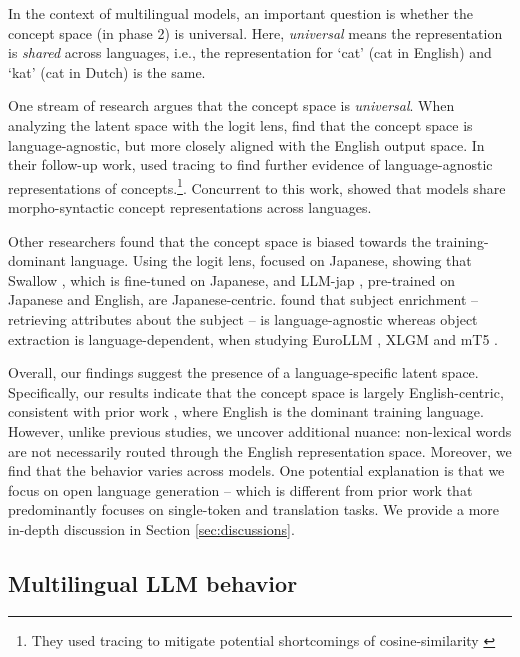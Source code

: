 In the context of multilingual models, an important question is whether the concept space (in phase 2) is universal. 
Here, \textit{universal} means the representation is \textit{shared} across languages, i.e., the representation for `cat' (cat in English) and `kat' (cat in Dutch) is the same.

One stream of research argues that the concept space is \textit{universal}. When analyzing the latent space with the logit lens, \citet{wendler2024llamasworkenglishlatent} 
find that the concept space is language-agnostic, but more closely aligned with the English output space.
In their follow-up work, \citet{dumas2024llamas} used tracing to find further evidence of language-agnostic representations of concepts.\footnote{They used tracing to mitigate potential shortcomings of cosine-similarity \citep{steck2024cosine}}.
Concurrent to this work, \citet{brinkmann2025large} showed that models share morpho-syntactic concept representations across languages.

Other researchers found that the concept space is biased towards the training-dominant language. 
Using the logit lens, \citet{zhong2024beyond} focused on Japanese, showing that Swallow \citep{fujii2024continual}, which is fine-tuned on Japanese, and LLM-jap \cite{aizawa2024llm}, pre-trained on Japanese and English, are Japanese-centric. 
\cite{fierro2025multilinguallanguagemodelsremember} found that subject enrichment -- retrieving attributes about the subject -- is language-agnostic whereas object extraction is language-dependent, when studying EuroLLM \citep{martins2024eurollmmultilinguallanguagemodels}, XLGM \citep{lin2022fewshotlearningmultilinguallanguage} and mT5 \citep{xue-etal-2021-mt5}. 


Overall, our findings suggest the presence of a language-specific latent space. Specifically, our results indicate that the concept space is largely English-centric, consistent with prior work \citet{zhong2024beyond, wu2024semantic}, where English is the dominant training language. However, unlike previous studies, we uncover additional nuance: non-lexical words are not necessarily routed through the English representation space.
Moreover, we find that the behavior varies across models. One potential explanation is that we focus on open language generation -- which is different from prior work that predominantly focuses on single-token and translation tasks. 
We provide a more in-depth discussion in Section \ref{sec:discussions}.

\subsection{Multilingual LLM behavior}

